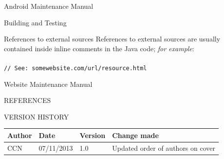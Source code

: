 \documentclass{article}
\newcommand{\versionhistory}{
		\begin{tabularx}{\linewidth}{| p{2cm} | p{2cm} | p{2cm} | X | }
			\hline
			\bf{Author} & \bf{Date} & \bf{Version} & \bf{Change made} \\
			\hline
			CCN & 07/11/2013 & 1.0 & Updated order of authors on cover \\
			\hline
		\end{tabularx}
}
\begin{document}
\begin{section}{Android Maintenance Manual}
\begin{subsection}{Building and Testing}
		\begin{subsubsection}{References to external sources}
			References to external sources are usually contained inside inline comments in the Java code; {\em for example}: \\ \\
			{\tt // See: somewebsite.com/url/resource.html}
		\end{subsubsection}
	\end{subsection}
	\end{section}
	
	\begin{section}{Website Maintenance Manual}
	
	
	\end{section}
	
	\nocite{LaTeXTemplate} %

	\newpage
	\begin{section}{REFERENCES}
		
		
	\end{section}
	
	\vspace{1cm}
	\begin{section}{VERSION HISTORY}
		\versionhistory
	\end{section}
\end{document}

